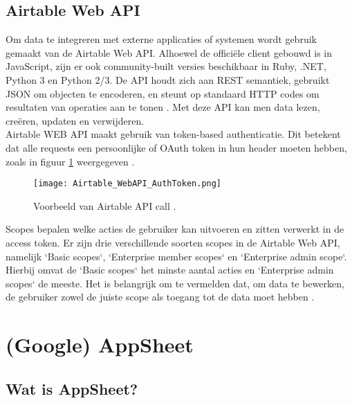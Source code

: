 \subsection{Airtable Web API}
\label{subsec:airtable_web_API}


Om data te integreren met externe applicaties of systemen wordt gebruik gemaakt van de Airtable Web API. Alhoewel de officiële client gebouwd is in JavaScript, zijn er ook community-built versies beschikbaar in Ruby, .NET, Python 3 en Python 2/3. De API houdt zich aan REST semantiek, gebruikt JSON om objecten te encoderen, en steunt op standaard HTTP codes om resultaten van operaties aan te tonen \autocite{AirtableAPI}. Met deze API kan men data lezen, creëren, updaten en verwijderen. \\

Airtable WEB API maakt gebruik van token-based authenticatie. Dit betekent dat alle requests een persoonlijke of OAuth token in hun header moeten hebben, zoals in figuur \ref{fig:airtable_authtoken} weergegeven \autocite{AirtableAPIAuthentication}. \\

\begin{figure}[h]
    \centering
    \texttt{[image: Airtable\_WebAPI\_AuthToken.png]}
    \caption[Voorbeeld Airtable API call]{Voorbeeld van Airtable API call \autocite{AirtableAPIAuthentication}.}
    \label{fig:airtable_authtoken}
\end{figure}

Scopes bepalen welke acties de gebruiker kan uitvoeren en zitten verwerkt in de access token. Er zijn drie verschillende soorten scopes in de Airtable Web API, namelijk `Basic scopes`, `Enterprise member scopes` en `Enterprise admin scope`. Hierbij omvat de `Basic scopes` het minste aantal acties en `Enterprise admin scopes` de meeste. Het is belangrijk om te vermelden dat, om data te bewerken, de gebruiker zowel de juiste scope als toegang tot de data moet hebben \autocite{AirtableAPIScopes}. \\

\section{(Google) AppSheet}
\label{sec:Appsheet}


\subsection{Wat is AppSheet?}
\label{subsec:wat_is_appsheet}

